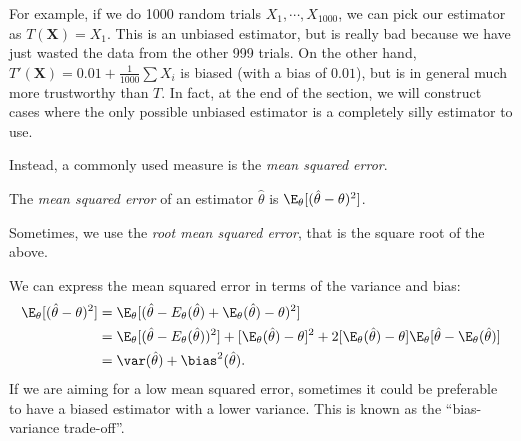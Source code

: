 \documentclass[a4paper]{article}
\begin{document}
For example, if we do 1000 random trials $X_1, \cdots, X_{1000}$, we can pick our estimator as $T(\mathbf{X}) = X_1$. This is an unbiased estimator, but is really bad because we have just wasted the data from the other 999 trials. On the other hand, $T'(\mathbf{X}) = 0.01 + \frac{1}{1000}\sum X_i$ is biased (with a bias of $0.01$), but is in general much more trustworthy than $T$. In fact, at the end of the section, we will construct cases where the only possible unbiased estimator is a completely silly estimator to use.

Instead, a commonly used measure is the \emph{mean squared error}.
\begin{defi}
  The \emph{mean squared error} of an estimator $\hat{\theta}$ is $\E_\theta[(\hat{\theta} - \theta)^2]$.

  Sometimes, we use the \emph{root mean squared error}, that is the square root of the above.
\end{defi}
We can express the mean squared error in terms of the variance and bias:
\begin{align*}
  \E_\theta[(\hat{\theta} - \theta)^2] &= \E_\theta[(\hat{\theta} - E_\theta(\hat{\theta}) + \E_\theta(\hat{\theta}) - \theta)^2]\\
  &= \E_\theta[(\hat{\theta} - E_\theta(\hat{\theta}))^2] + [\E_\theta(\hat{\theta}) - \theta]^2 + 2[\E_\theta(\hat{\theta}) - \theta]\E_\theta[\hat{\theta} - \E_\theta(\hat{\theta})]\\
  &= \var(\hat{\theta}) + \bias^2(\hat{\theta}).
\end{align*}
If we are aiming for a low mean squared error, sometimes it could be preferable to have a biased estimator with a lower variance. This is known as the ``bias-variance trade-off''.
\end{document}
